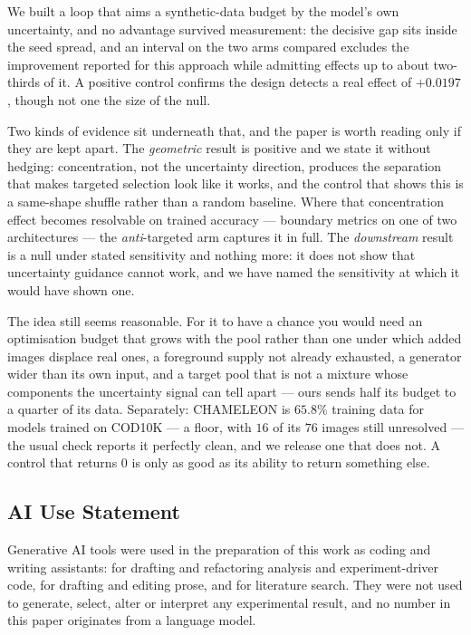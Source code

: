 \documentclass{article} %
\begin{document}
We built a loop that aims a synthetic-data budget by the model's own uncertainty, and no advantage
survived measurement: the decisive gap sits inside the seed spread, and an interval on the two arms
compared excludes the improvement reported for this approach while admitting effects up to about
two-thirds of it. A positive control confirms the design detects a real effect of $+0.0197$, though
not one the size of the null.

Two kinds of evidence sit underneath that, and the paper is worth reading only if they are kept
apart. The \emph{geometric} result is positive and we state it without hedging: concentration, not
the uncertainty direction, produces the separation that makes targeted selection look like it works,
and the control that shows this is a same-shape shuffle rather than a random baseline. Where that
concentration effect becomes resolvable on trained accuracy --- boundary metrics on one of two
architectures --- the \emph{anti}-targeted arm captures it in full. The \emph{downstream} result is a
null under stated sensitivity and nothing more: it does not show that uncertainty guidance cannot
work, and we have named the sensitivity at which it would have shown one.

The idea still seems reasonable. For it to have a chance you would need an optimisation budget that
grows with the pool rather than one under which added images displace real ones, a foreground supply
not already exhausted, a generator wider than its own input, and a target pool that is not a mixture
whose components the uncertainty signal can tell apart --- ours sends half its budget to a quarter of
its data. Separately: CHAMELEON is $65.8\%$ training data for models trained on COD10K --- a floor,
with $16$ of its $76$ images still unresolved ---
the usual check reports it perfectly clean, and we release one that does not. A control that returns
$0$ is only as good as its ability to return something else.

\subsection*{AI Use Statement}

Generative AI tools were used in the preparation of this work as coding and writing assistants:
for drafting and refactoring analysis and experiment-driver code, for drafting and editing prose,
and for literature search. They were not used to generate, select, alter or interpret any
experimental result, and no number in this paper originates from a language model.
\end{document}
